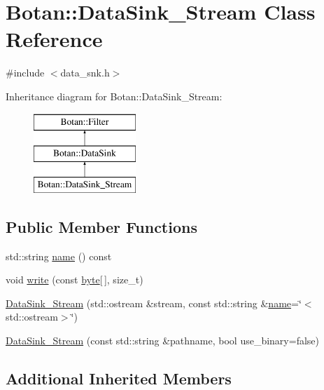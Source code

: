 \hypertarget{classBotan_1_1DataSink__Stream}{\section{Botan\-:\-:Data\-Sink\-\_\-\-Stream Class Reference}
\label{classBotan_1_1DataSink__Stream}
}


{\ttfamily \#include $<$data\-\_\-snk.\-h$>$}

Inheritance diagram for Botan\-:\-:Data\-Sink\-\_\-\-Stream\-:\begin{figure}[H]
\begin{center}
\leavevmode
\includegraphics[height=3.000000cm]{classBotan_1_1DataSink__Stream}
\end{center}
\end{figure}
\subsection*{Public Member Functions}
\begin{DoxyCompactItemize}
\item 
std\-::string \hyperlink{classBotan_1_1DataSink__Stream_a36b422bdd22cd9993e0f93b4eb84f537}{name} () const 
\item 
void \hyperlink{classBotan_1_1DataSink__Stream_a680cea6422e4dc127da837cb69884689}{write} (const \hyperlink{namespaceBotan_a7d793989d801281df48c6b19616b8b84}{byte}\mbox{[}$\,$\mbox{]}, size\-\_\-t)
\item 
\hyperlink{classBotan_1_1DataSink__Stream_ab5322d8e3bb3a6529153ce43fef5bd2d}{Data\-Sink\-\_\-\-Stream} (std\-::ostream \&stream, const std\-::string \&\hyperlink{classBotan_1_1DataSink__Stream_a36b422bdd22cd9993e0f93b4eb84f537}{name}=\char`\"{}$<$std\-::ostream$>$\char`\"{})
\item 
\hyperlink{classBotan_1_1DataSink__Stream_a671e00b219a1fcb600c3f7202f9805c1}{Data\-Sink\-\_\-\-Stream} (const std\-::string \&pathname, bool use\-\_\-binary=false)
\end{DoxyCompactItemize}
\subsection*{Additional Inherited Members}


